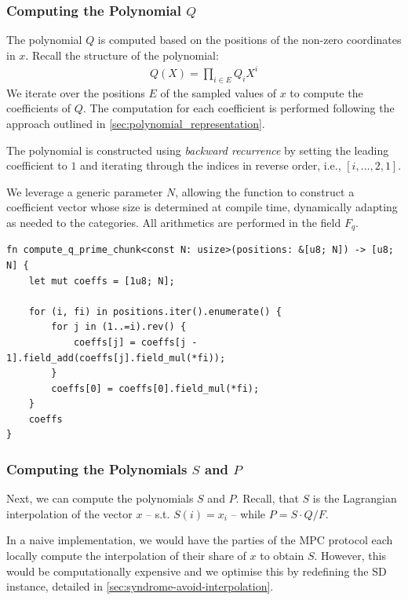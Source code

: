 \documentclass[11pt]{report}
\theoremstyle{definition}
\theoremstyle{plain}
\begin{document}
\subsubsection{Computing the Polynomial $Q$}

The polynomial $Q$ is computed based on the positions of the non-zero coordinates in $x$. Recall the structure of the polynomial:
\begin{align*}
  Q(X) = \prod_{i\in E} Q_i X^i
\end{align*}
We iterate over the positions $E$ of the sampled values of $x$ to compute the coefficients of $Q$. The computation for each coefficient is performed following the approach outlined in \autoref{sec:polynomial_representation}.

The polynomial is constructed using \textit{backward recurrence} by setting the leading coefficient to $1$ and iterating through the indices in reverse order, i.e., $[i, \dots, 2, 1]$.

We leverage a generic parameter $N$, allowing the function to construct a coefficient vector whose size is determined at compile time, dynamically adapting as needed to the categories. All arithmetics are performed in the field $F_q$.

\begin{verbatim}
fn compute_q_prime_chunk<const N: usize>(positions: &[u8; N]) -> [u8; N] {
    let mut coeffs = [1u8; N];

    for (i, fi) in positions.iter().enumerate() {
        for j in (1..=i).rev() {
            coeffs[j] = coeffs[j - 1].field_add(coeffs[j].field_mul(*fi));
        }
        coeffs[0] = coeffs[0].field_mul(*fi);
    }
    coeffs
}
\end{verbatim}

\subsubsection{Computing the Polynomials $S$ and $P$}

Next, we can compute the polynomials $S$ and $P$. Recall, that $S$ is the Lagrangian interpolation of the vector $x$ -- s.t. $S(i) = x_i$ -- while $P = S \cdot Q / F$.

In a naive implementation, we would have the parties of the MPC protocol each locally compute the interpolation of their share of $x$ to obtain $S$. However, this would be computationally expensive and we optimise this by redefining the SD instance, detailed in \autoref{sec:syndrome-avoid-interpolation}.
\end{document}
